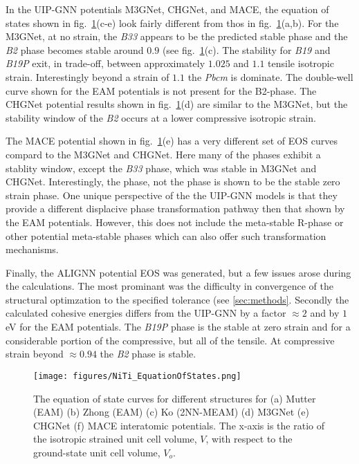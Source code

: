 \documentclass[preprint,colorlinks=true,linkcolor=black,citecolor=black]{elsarticle}
\begin{document}
In the UIP-GNN potentials M3GNet, CHGNet, and MACE, the equation of
states shown in fig.~\ref{fig:eos}(c-e) look fairly different from
thos in fig.~\ref{fig:eos}(a,b). For the M3GNet, at no strain, the
\textit{B33} appears to be the predicted stable phase and the
\textit{B2} phase becomes stable around $0.9$ (see
fig.~\ref{fig:eos}(c). The stability for \textit{B19} and
\textit{B19P} exit, in trade-off, between approximately $1.025$ and
$1.1$ tensile isotropic strain. Interestingly beyond a strain of $1.1$
the \textit{Pbcm} is dominate. The double-well curve shown for the EAM
potentials is not present for the B2-phase. The CHGNet potential
results shown in fig.~\ref{fig:eos}(d) are similar to the M3GNet, but
the stability window of the \textit{B2} occurs at a lower compressive
isotropic strain. \par

The MACE potential shown in fig.~\ref{fig:eos}(e) has a very different
set of EOS curves compard to the M3GNet and CHGNet. Here many of the
phases exhibit a stablity window, except the \textit{B33} phase, which
was stable in M3GNet and CHGNet. Interestingly, the  phase,
not the  phase is shown to be the stable zero strain
phase. One unique perspective of the the UIP-GNN models is that they
provide a different displacive phase transformation pathway then that
shown by the EAM potentials. However, this does not include the
meta-stable R-phase or other potential meta-stable phases which can
also offer such transformation mechanisms. \par


Finally, the ALIGNN potential EOS was generated, but a few issues
arose during the calculations. The most prominant was the difficulty
in convergence of the structural optimzation to the specified
tolerance (see \ref{sec:methods}. Secondly the calculated cohesive
energies differs from the UIP-GNN by a factor $\approx 2$ and by $1$
eV for the EAM potentials. The \textit{B19P} phase is the stable at
zero strain and for a considerable portion of the compressive, but all
of the tensile. At compressive strain beyond $\approx 0.94$ the
\textit{B2} phase is stable.



\begin{figure}[ht!]
  \begin{centering}
    \texttt{[image: figures/NiTi\_EquationOfStates.png]}
    \caption{ The equation of state curves for different 
      structures for (a) Mutter (EAM) (b) Zhong (EAM) (c) Ko
      (2NN-MEAM) (d) M3GNet (e) CHGNet (f) MACE interatomic
      potentials. The x-axis is the ratio of the isotropic strained
      unit cell volume, $V$, with respect to the ground-state unit
      cell volume, $V_o$.  }
    \label{fig:eos}
  \end{centering}
\end{figure}
\end{document}
